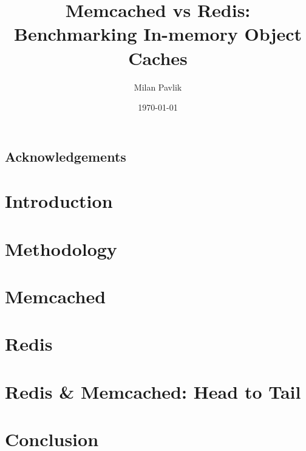 \documentclass[bsc,frontabs,twoside,singlespacing,parskip,deptreport]{./infthesis}
\begin{document}
\title{Memcached vs Redis: Benchmarking In-memory Object Caches}

\author{Milan Pavlik}



\date{\today}

\abstract{}

\maketitle

\section*{Acknowledgements}


\tableofcontents



\chapter{Introduction}




\chapter{Methodology}


\chapter{Memcached}


\chapter{Redis}


\chapter{Redis \& Memcached: Head to Tail}


\chapter{Conclusion}







\end{document}
